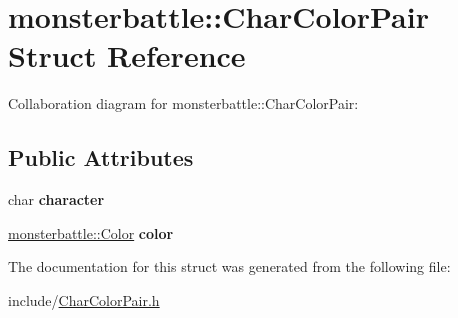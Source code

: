 \hypertarget{structmonsterbattle_1_1CharColorPair}{}\section{monsterbattle\+:\+:Char\+Color\+Pair Struct Reference}
\label{structmonsterbattle_1_1CharColorPair}


Collaboration diagram for monsterbattle\+:\+:Char\+Color\+Pair\+:
\subsection*{Public Attributes}
\begin{DoxyCompactItemize}
\item 
\mbox{\label{structmonsterbattle_1_1CharColorPair_acb49bb85490f1229149e1cb40a2ebee9}} 
char {\bfseries character}
\item 
\mbox{\label{structmonsterbattle_1_1CharColorPair_adde2986f9fcc1aa9ef928836e7475bea}} 
\hyperlink{structmonsterbattle_1_1Color}{monsterbattle\+::\+Color} {\bfseries color}
\end{DoxyCompactItemize}


The documentation for this struct was generated from the following file\+:\begin{DoxyCompactItemize}
\item 
include/\hyperlink{CharColorPair_8h}{Char\+Color\+Pair.\+h}\end{DoxyCompactItemize}
